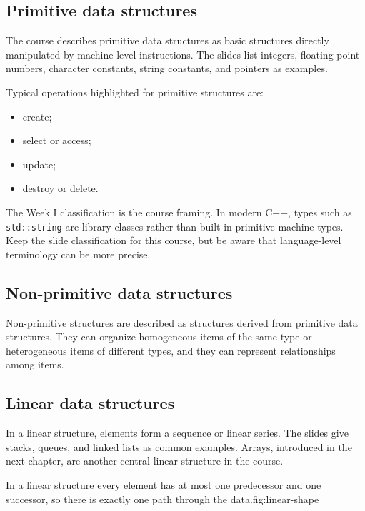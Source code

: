 \subsection{Primitive data structures}

The course describes primitive data structures as basic structures directly manipulated by machine-level instructions. The slides list integers, floating-point numbers, character constants, string constants, and pointers as examples.

Typical operations highlighted for primitive structures are:

\begin{itemize}
  \item create;
  \item select or access;
  \item update;
  \item destroy or delete.
\end{itemize}

\begin{clarification}
The Week I classification is the course framing. In modern C++, types such as \texttt{std::string} are library classes rather than built-in primitive machine types. Keep the slide classification for this course, but be aware that language-level terminology can be more precise.
\end{clarification}

\subsection{Non-primitive data structures}

Non-primitive structures are described as structures derived from primitive data structures. They can organize homogeneous items of the same type or heterogeneous items of different types, and they can represent relationships among items.

\subsection{Linear data structures}

In a linear structure, elements form a sequence or linear series. The slides give stacks, queues, and linked lists as common examples. Arrays, introduced in the next chapter, are another central linear structure in the course.

\begin{utpfig}{In a linear structure every element has at most one predecessor and one
successor, so there is exactly one path through the data.}{fig:linear-shape}
\end{utpfig}


